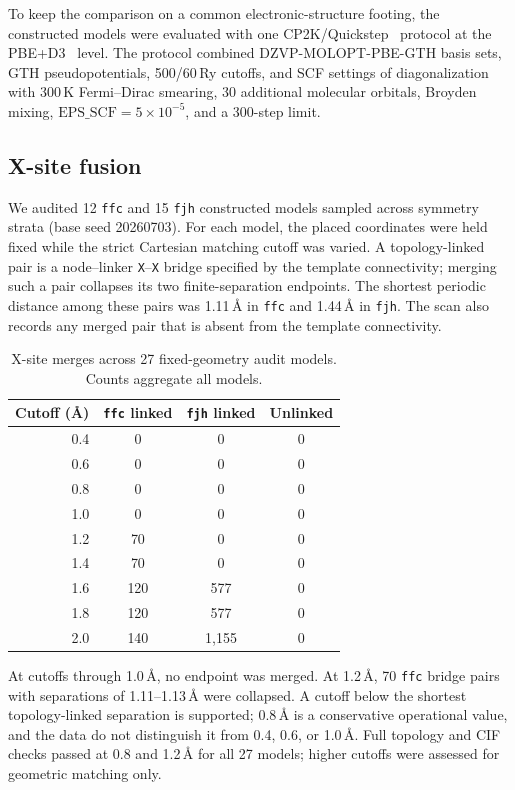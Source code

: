 \documentclass[a5paper, 10pt]{article}
\begin{document}
To keep the comparison on a common electronic-structure footing, the constructed models were evaluated with one CP2K/Quickstep~\cite{cp2k2020} protocol at the PBE+D3~\cite{perdew1996pbe,grimme2010d3} level. The protocol combined DZVP-MOLOPT-PBE-GTH basis sets, GTH pseudopotentials, 500/60\,Ry cutoffs, and SCF settings of diagonalization with 300\,K Fermi--Dirac smearing, 30 additional molecular orbitals, Broyden mixing, $\mathrm{EPS\_SCF}=5\times10^{-5}$, and a 300-step limit.

\subsection{X-site fusion}
\label{app:x_fusion}

We audited 12 \texttt{ffc} and 15 \texttt{fjh} constructed models sampled across symmetry strata (base seed 20260703). For each model, the placed coordinates were held fixed while the strict Cartesian matching cutoff was varied. A topology-linked pair is a node--linker \texttt{X}--\texttt{X} bridge specified by the template connectivity; merging such a pair collapses its two finite-separation endpoints. The shortest periodic distance among these pairs was 1.11\,\AA{} in \texttt{ffc} and 1.44\,\AA{} in \texttt{fjh}. The scan also records any merged pair that is absent from the template connectivity.

\begin{table}[ht]
\centering
\scriptsize
\setlength{\tabcolsep}{3pt}
\caption{X-site merges across 27 fixed-geometry audit models. Counts aggregate all models.}
\label{tab:x-fusion-sensitivity}
\begin{tabular}{rccc}
\hline
Cutoff (\AA) & \texttt{ffc} linked & \texttt{fjh} linked & Unlinked \\
\hline
0.4 & 0 & 0 & 0 \\
0.6 & 0 & 0 & 0 \\
0.8 & 0 & 0 & 0 \\
1.0 & 0 & 0 & 0 \\
1.2 & 70 & 0 & 0 \\
1.4 & 70 & 0 & 0 \\
1.6 & 120 & 577 & 0 \\
1.8 & 120 & 577 & 0 \\
2.0 & 140 & 1,155 & 0 \\
\hline
\end{tabular}
\end{table}

At cutoffs through 1.0\,\AA{}, no endpoint was merged. At 1.2\,\AA{}, 70 \texttt{ffc} bridge pairs with separations of 1.11--1.13\,\AA{} were collapsed. A cutoff below the shortest topology-linked separation is supported; 0.8\,\AA{} is a conservative operational value, and the data do not distinguish it from 0.4, 0.6, or 1.0\,\AA{}. Full topology and CIF checks passed at 0.8 and 1.2\,\AA{} for all 27 models; higher cutoffs were assessed for geometric matching only.
\end{document}
